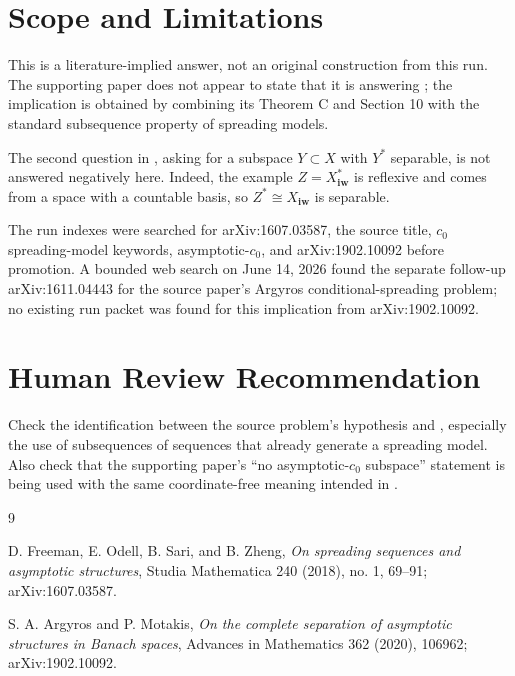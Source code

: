 \documentclass[11pt]{article}
\newcommand{\cnull}{c_0}
\newcommand{\Xiw}{X_{\mathbf{iw}}}
\begin{document}
\section*{Scope and Limitations}

This is a literature-implied answer, not an original construction from this
run. The supporting paper does not appear to state that it is answering
\cite[Problem 4.5]{FOSZ}; the implication is obtained by combining its Theorem
C and Section 10 with the standard subsequence property of spreading models.

The second question in \cite[Problem 4.5]{FOSZ}, asking for a subspace
\(Y\subset X\) with \(Y^*\) separable, is not answered negatively here. Indeed,
the example \(Z=\Xiw^*\) is reflexive and comes from a space with a countable
basis, so \(Z^*\cong \Xiw\) is separable.

The run indexes were searched for arXiv:1607.03587, the source title,
\(\cnull\) spreading-model keywords, asymptotic-\(\cnull\), and arXiv:1902.10092
before promotion. A bounded web search on June 14, 2026 found the separate
follow-up arXiv:1611.04443 for the source paper's Argyros conditional-spreading
problem; no existing run packet was found for this implication from
arXiv:1902.10092.

\section*{Human Review Recommendation}

Check the identification between the source problem's hypothesis and
\cite[Theorem C(i)]{AM}, especially the use of subsequences of sequences that
already generate a spreading model. Also check that the supporting paper's
``no asymptotic-\(\cnull\) subspace'' statement is being used with the same
coordinate-free meaning intended in \cite[Problem 4.5]{FOSZ}.

\begin{thebibliography}{9}

D. Freeman, E. Odell, B. Sari, and B. Zheng,
\emph{On spreading sequences and asymptotic structures},
Studia Mathematica 240 (2018), no. 1, 69--91; arXiv:1607.03587.

S. A. Argyros and P. Motakis,
\emph{On the complete separation of asymptotic structures in Banach spaces},
Advances in Mathematics 362 (2020), 106962; arXiv:1902.10092.

\end{thebibliography}
\end{document}
